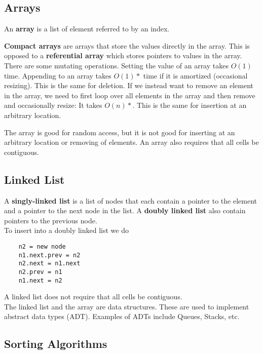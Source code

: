\documentclass[]{article}
\begin{document}
\subsection{Arrays}\bigbreak

An \textbf{array} is a list of element referred to by an index.

\textbf{Compact arrays} are arrays that store the values directly in the array. This is opposed to a \textbf{referential array} which stores pointers to values in the array.\\

There are some mutating operations. Setting the value of an array takes $O(1)$ time. Appending to an array takes $O(1)*$ time if it is amortized (occasional resizing). This is the same for deletion. If we instead want to remove an element in the array, we need to first loop over all elements in the array and then remove and occasionally resize: It takes $O(n)*$. This is the same for insertion at an arbitrary location.

The array is good for random access, but it is not good for inserting at an arbitrary location or removing of elements. An array also requires that all cells be contiguous.

\subsection{Linked List}\bigbreak

A \textbf{singly-linked list} is a list of nodes that each contain a pointer to the element and a pointer to the next node in the list. A \textbf{doubly linked list} also contain pointers to the previous node.\\

To insert into a doubly linked list we do

\begin{lstlisting}
	n2 = new node
	n1.next.prev = n2
	n2.next = n1.next
	n2.prev = n1
	n1.next = n2
\end{lstlisting}\bigbreak

A linked list does not require that all cells be contiguous.\\

The linked list and the array are data structures. These are used to implement abstract data types (ADT). Examples of ADTs include Queues, Stacks, etc.\\

\subsection{Sorting Algorithms}\bigbreak
\end{document}
